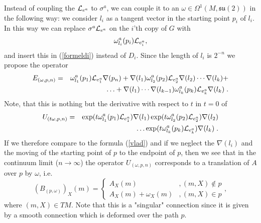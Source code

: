 \documentclass[12pt]{article}
\newcommand{\nn}{\nonumber}
\def\cl{{\cal L}}
\begin{document}
Instead of coupling the $\cl_{e^a}$ to $\sigma^a$, we can couple it to an $\omega \in \Omega^1 (M, \mathfrak{su}(2))$ in the following way: 
% 
we consider $l_i$ as a tangent vector in the starting point $p_i$ of $l_i$. In this way we can replace  $\sigma^a\cl_{e^a}$ on the $i$'th copy of $G$ with 
$$ \omega^a_{l_i} (p_i) \cl_{e^a_{i}} , $$
and insert this in (\ref{formeldi}) instead of $D_i$. Since the length of $l_i$ is $2^{-n}$ we propose the operator 
\begin{eqnarray}
E_{(\omega,p,n)}&=& \omega^a_{l_1} (p_1) \cl_{e^a_{1}} \nabla(p_n) +\nabla({l_1}) \omega^a_{l_2} (p_2) \cl_{e^a_{2}}\nabla({l_{2}})  \cdots \nabla({l_k})+
\nn\\&&
\ldots+ \nabla({l_1})\cdots \nabla({l_{k-1}}) \omega^a_{l_k} (p_k) \cl_{e^a_{k}} \nabla({l_k})  \nn  \;.
\end{eqnarray}
Note, that this is nothing but the derivative with respect to $t$ in $t=0$ of 
\begin{eqnarray} 
U_{(t \omega,p,n)} &=  &
\exp (t \omega^a_{l_1} (p_1) \cl_{e^a_{1}}) \nabla({l_1}) \exp (t\omega^a_{l_2} (p_2)  \cl_{e^a_{2}})\nabla({l_2})
\nn\\&&
\ldots 
 \exp (t\omega^a_{l_k} (p_k) \cl_{e^a_{k}} ) \nabla({l_k})    \; .
 \label{Yoda}
\end{eqnarray}
If we therefore compare to the formula (\ref{vlad}) and if we neglect the $\nabla({l_i})$ and the moving of the starting point of $p$ to the endpoint of $p$, then we see that in the continuum limit ($n\to \infty $) the operator $U_{(\omega , p, n)}  $ corresponds to a translation of $A$  over $p$ by $\omega$, i.e.
$$ (B_{(p,\omega)})_X(m)=\left\{  \begin{array}{cl}   
A_X(	m	)&, (m,X)\notin p \\ 
A_X(m)+\omega_X(m)&, (m,X) \in p
\end{array}  \right.  , $$
where $(m,X)\in TM$. Note that this  is a "singular" connection since it is given by a smooth connection which is deformed over the path $p$.   
\end{document}
